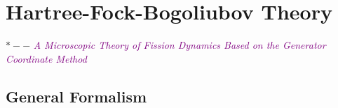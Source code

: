 \chapter{Hartree-Fock-Bogoliubov Theory}

  $\ast -- $ \textcolor{purple}{\textit{A Microscopic Theory of Fission Dynamics Based on the Generator Coordinate Method}}

  \section{General Formalism}
